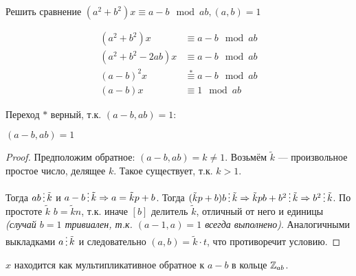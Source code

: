 \begin{exercise}
    Решить сравнение \((a^2 + b^2)x \equiv a - b \mod ab, (a, b) = 1\)
\end{exercise}
\begin{solution}
    \begin{align*}
        (a^2 + b^2)x       & \equiv a - b \mod ab               \\
        (a^2 + b^2 - 2ab)x & \equiv a - b \mod ab               \\
        (a - b)^2 x        & \stackrel{*}{\equiv} a - b \mod ab \\
        (a - b) x          & \equiv 1 \mod ab
    \end{align*}

    Переход \(*\) верный, т.к. \((a - b, ab) = 1\):
    
    \begin{statement}
        \((a - b, ab) = 1\)
    \end{statement}
    \begin{proof}
        Предположим обратное: \((a - b, ab) = k \neq 1\). Возьмём \(\tilde{k}\) --- произвольное простое число, делящее \(k\). Такое существует, т.к. \(k > 1\).
        
        Тогда \(ab \divided \tilde{k}\) и \(a - b \divided \tilde{k} \Rightarrow a = \tilde{k}p + b\). Тогда \((\tilde{k}p + b)b \divided \tilde{k} \Rightarrow \tilde{k}pb + b^2 \divided \tilde{k} \Rightarrow b^2 \divided \tilde{k}\). По простоте \(\tilde{k}\) \(b = \tilde{k}n\), т.к. иначе \([b]\) делитель \(\tilde{k}\), отличный от него и единицы \textit{(случай \(b = 1\) тривиален, т.к. \((a - 1, a) = 1\) всегда выполнено)}. Аналогичными выкладками \(a \divided \tilde{k}\) и следовательно \((a, b) = \tilde{k} \cdot t\), что противоречит условию.
    \end{proof}

    \(x\) находится как мультипликативное обратное к \(a - b\) в кольце \(\mathbb{Z}_{ab}\).
\end{solution}


